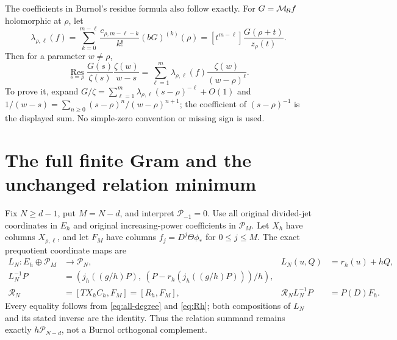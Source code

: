 \documentclass[11pt]{article}
\newcommand{\PP}{\mathcal P}\newcommand{\Fc}{\mathcal F_+}
\begin{document}
The coefficients in Burnol's residue formula also follow exactly.
For $G=\mathcal M_{\!R} f$ holomorphic at $\rho$, let
\begin{equation}\label{eq:residue-coeff}
 \lambda_{\rho,\ell}(f)=
 \sum_{k=0}^{m-\ell}\frac{c_{\rho,m-\ell-k}}{k!}
                 (bG)^{(k)}(\rho)
 = [t^{m-\ell}]\frac{G(\rho+t)}{z_\rho(t)}.
\end{equation}
Then for a parameter $w\ne\rho$,
\begin{equation}\label{eq:residue}
 \operatorname*{Res}_{s=\rho}
   \frac{G(s)}{\zeta(s)}\frac{\zeta(w)}{w-s}
   =\sum_{\ell=1}^m\lambda_{\rho,\ell}(f)
                                    \frac{\zeta(w)}{(w-\rho)^\ell}.
\end{equation}
To prove it, expand $G/\zeta=\sum_{\ell=1}^m
\lambda_{\rho,\ell}(s-\rho)^{-\ell}+O(1)$ and
$1/(w-s)=\sum_{n\geq0}(s-\rho)^n/(w-\rho)^{n+1}$;
the coefficient of $(s-\rho)^{-1}$ is the displayed sum.
No simple-zero convention or missing sign is used.

\section{The full finite Gram and the unchanged relation minimum}

Fix $N\geq d-1$, put $M=N-d$, and interpret $\PP_{-1}=0$.
Use all original divided-jet coordinates in $E_h$ and original
increasing-power coefficients in $\PP_M$. Let $X_h$ have columns
$X_{\rho,\ell}$, and let $F_M$ have columns
$f_j=D^j\Theta\phi_*$ for $0\leq j\leq M$. The exact
prequotient coordinate maps are
\begin{equation}\label{eq:LN}
 \begin{aligned}
 L_N:E_h\oplus\PP_M&\longrightarrow\PP_N,&
 L_N(u,Q)&=r_h(u)+hQ,\\
 L_N^{-1}P&=\left(j_h((g/h)P),\ (P-r_h(j_h((g/h)P)))/h\right),\\
 \mathcal R_N&=[T X_hC_h,F_M]=[R_h,F_M],&
 \mathcal R_NL_N^{-1}P&=P(D)F_h.
 \end{aligned}
\end{equation}
Every equality follows from \eqref{eq:all-degree} and
\eqref{eq:Rh}; both compositions of $L_N$ and its stated
inverse are the identity. Thus the relation summand remains
exactly $h\PP_{N-d}$, not a Burnol orthogonal complement.
\end{document}
